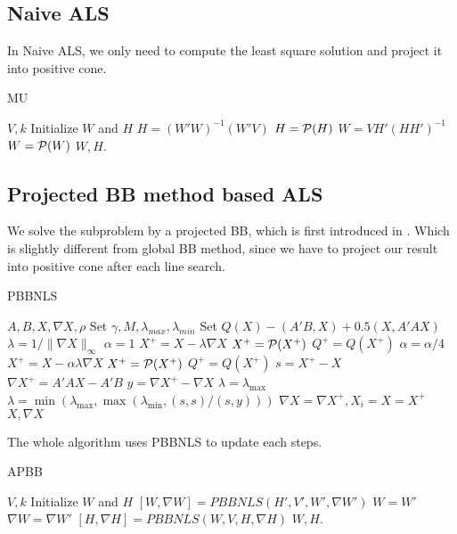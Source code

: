 \documentclass{article}
\renewcommand{\grad}{\nabla}
\begin{document}
\subsection{Naive ALS}
In Naive ALS, we only need to compute the least square solution and project it into positive cone.

\begin{algorithm}[H]
	\caption{MU}
	\begin{algorithmic}[1]
		\REQUIRE $V, k$
		\STATE Initialize $W$ and $H$ 
		\STATE $H = (W'W)^{-1}(W'V)$
		\STATE $H = \P(H)$
		\STATE $W = VH'(HH')^{-1}$
		\STATE $W = \P(W)$
		\ENDWHILE
		\STATE \Return $W,H$.
	\end{algorithmic}
\end{algorithm}


\subsection{Projected BB method based ALS}
We solve the subproblem by a projected BB, which is first introduced in \cite{apbb}. Which is slightly different from global BB method, since we have to project our result into positive cone after each line search.

\begin{algorithm}[H]
	\caption{PBBNLS}
	\begin{algorithmic}[1]
		\REQUIRE $A,B,X, \grad X,\rho$
		\STATE Set $\gamma, M, \lambda_{max}, \lambda_{min}$
		\STATE Set $Q(X) -(A'B,X) + 0.5 (X, A'AX)$
		\STATE $\lambda = 1/\|\grad X\|_{\infty}$
		\STATE $\alpha = 1$
		\STATE $X^+ = X - \lambda \grad X$
		\STATE $X^+ = \P(X^+)$
		\STATE $Q^+ = Q(X^+)$
		\WHILE{$\lambda > \lambda_{min}$ and $Q^+ < \max_{i-M<k<i}Q(X_i) + \gamma \alpha (\grad X, D)$}
		\STATE $\alpha = \alpha / 4$
		\STATE $X^+ = X - \alpha\lambda\grad X$
		\STATE $X^+ = \P(X^+)$
		\STATE $Q^+ = Q(X^+)$
		\ENDWHILE
		\STATE $s = X^+ - X$
		\STATE $\grad X^+ = A'AX-A'B$
		\STATE $y = \grad X^+ - \grad X$
		\STATE $\lambda = \lambda_{\max}$
		\ELSE
		\STATE $\lambda = \min(\lambda_{\max}, \max(\lambda_{\min}, (s,s)/(s,y)))$
		\ENDIF
		\STATE $\grad X = \grad X^+,X_i = X  = X^+$
		\ENDFOR
		\STATE \Return $X, \grad X$
	\end{algorithmic}
\end{algorithm}

The whole algorithm uses PBBNLS to update each steps.

\begin{algorithm}[H]
	\caption{APBB}
	\begin{algorithmic}[1]
		\REQUIRE $V, k$
		\STATE Initialize $W$ and $H$ 
		\STATE $[W,\grad W] = PBBNLS(H', V', W', \grad W')$
		\STATE $W = W'$
		\STATE $\grad W = \grad W'$
		\STATE $[H,\grad H] = PBBNLS(W,V,H,\grad H)$
		\ENDWHILE
		\STATE \Return $W,H$.
	\end{algorithmic}
\end{algorithm}
\end{document}
